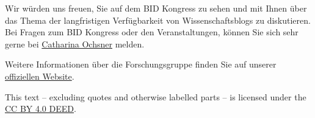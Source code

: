 \documentclass[
  letterpaper,
  DIV=11]{scrartcl}
\begin{document}
Wir würden uns freuen, Sie auf dem BID Kongress zu sehen und mit Ihnen
über das Thema der langfristigen Verfügbarkeit von Wissenschaftsblogs zu
diskutieren. Bei Fragen zum BID Kongress oder den Veranstaltungen,
können Sie sich sehr gerne bei
\href{mailto:catharina.ochsner@hu-berlin.de}{Catharina Ochsner} melden.

Weitere Informationen über die Forschungsgruppe finden Sie auf unserer
\href{http://hu.berlin/infomgnt}{offiziellen Website}.

This text -- excluding quotes and otherwise labelled parts -- is
licensed under the
\href{https://creativecommons.org/licenses/by/4.0/deed.de}{CC BY 4.0
DEED}.
\end{document}
